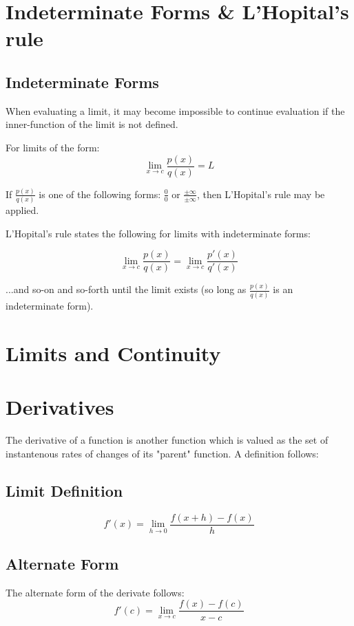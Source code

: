 \section{Indeterminate Forms \& L'Hopital's rule}
\subsection{Indeterminate Forms}
When evaluating a limit, it may become impossible to continue evaluation if the
inner-function of the limit is not defined.

For limits of the form:
$$\lim_{x\to{c}}\frac{p(x)}{q(x)}=L$$

If $\frac{p(x)}{q(x)}$ is one of the following forms: $\frac{0}{0}$ or
$\frac{\pm\infty}{\pm\infty}$, then L'Hopital's rule may be applied.

L'Hopital's rule states the following for limits with indeterminate forms:

\begin{equation}
  \lim_{x\to{c}} \frac{p(x)}{q(x)} = \lim_{x\to{c}} \frac{p'(x)}{q'(x)}
\end{equation}

...and so-on and so-forth until the limit exists (so long as $\frac{p(x)}{q(x)}$
is an indeterminate form).

\section{Limits and Continuity}
\section{Derivatives}
The derivative of a function is another function which is valued as the set of
instantenous rates of changes of its "parent" function. A definition follows:

\subsection{Limit Definition}
\begin{equation}
  f'(x)=\lim_{h\to{0}} \frac{f(x+h)-f(x)}{h}
\end{equation}

\subsection{Alternate Form}
The alternate form of the derivate follows:
\begin{equation}
  f'(c)=\lim_{x\to{c}} \frac{f(x)-f(c)}{x-c}
\end{equation}

